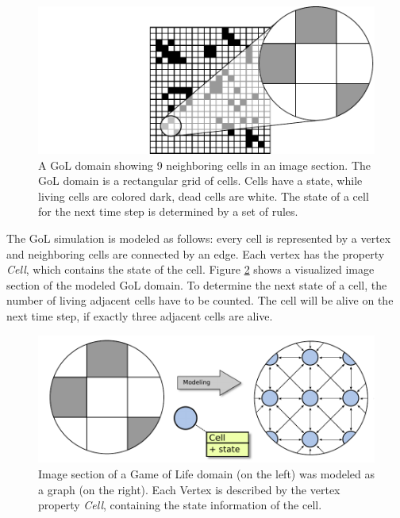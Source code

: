 \begin{figure}[H]
  \centering \includegraphics[width=\textwidth]{graphics/30_gol_simulation}
  \caption{A GoL domain showing 9 neighboring cells in an image section. The GoL
    domain is a rectangular grid of cells.  Cells have a state, while
    living cells are colored dark, dead cells are white. The state of
    a cell for the next time step is determined by a set of rules.}
  \label{fig:gol_simulation}
\end{figure}

\noindent The GoL simulation is modeled as follows:
every cell is represented by a vertex and neighboring cells are
connected by an edge.  Each vertex has the property \emph{Cell}, which
contains the state of the cell. Figure \ref{fig:gol_modeling} shows a
visualized image section of the modeled GoL domain. To determine the next
state of a cell, the number of living adjacent cells have to be counted. The cell
will be alive on the next time step, if exactly three adjacent cells
are alive.


\begin{figure}[H]
  \centering \includegraphics[width=\textwidth]{graphics/30_gol_modeling}
  \caption{Image section of a Game of Life domain (on the left) was modeled
    as a graph (on the right). Each Vertex is described by the vertex
    property \emph{Cell}, containing the state information of the cell.}
  \label{fig:gol_modeling}
\end{figure}

